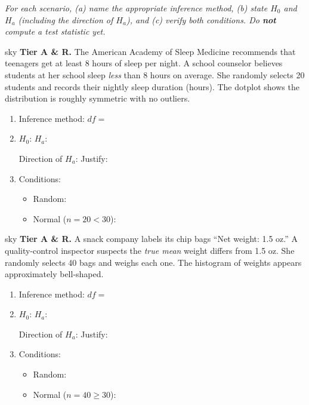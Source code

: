 \documentclass[10pt]{article}
\begin{document}
\namepartnerperiod

\vspace{0.15in}

\textit{For each scenario, (a) name the appropriate inference method, (b) state $H_0$ and
$H_a$ (including the direction of $H_a$), and (c) verify both conditions. Do \textbf{not}
compute a test statistic yet.}

\begin{scenariobox}{sky}
\textbf{Tier A \& R.} \quad
The American Academy of Sleep Medicine recommends that teenagers get at least 8 hours of sleep
per night. A school counselor believes students at her school sleep \emph{less} than 8 hours
on average. She randomly selects 20 students and records their nightly sleep duration (hours).
The dotplot shows the distribution is roughly symmetric with no outliers.

\begin{enumerate}[label=\alph*.]
  \item Inference method: \blank{5cm} \quad $df = $ \blank{1.5cm}
  \item $H_0$: \blank{4.5cm} \quad $H_a$: \blank{4.5cm}

        Direction of $H_a$: \blank{2cm} \quad Justify: \writeline

  \item Conditions:
        \begin{itemize}
          \item Random: \writeline
          \item Normal ($n = 20 < 30$): \writeline
        \end{itemize}
\end{enumerate}
\end{scenariobox}

\begin{scenariobox}{sky}
\textbf{Tier A \& R.} \quad
A snack company labels its chip bags ``Net weight: 1.5 oz.'' A quality-control inspector
suspects the \emph{true mean} weight differs from 1.5 oz. She randomly selects 40 bags and
weighs each one. The histogram of weights appears approximately bell-shaped.

\begin{enumerate}[label=\alph*.]
  \item Inference method: \blank{5cm} \quad $df = $ \blank{1.5cm}
  \item $H_0$: \blank{4.5cm} \quad $H_a$: \blank{4.5cm}

        Direction of $H_a$: \blank{2cm} \quad Justify: \writeline

  \item Conditions:
        \begin{itemize}
          \item Random: \writeline
          \item Normal ($n = 40 \ge 30$): \writeline
        \end{itemize}
\end{enumerate}
\end{scenariobox}
\end{document}
